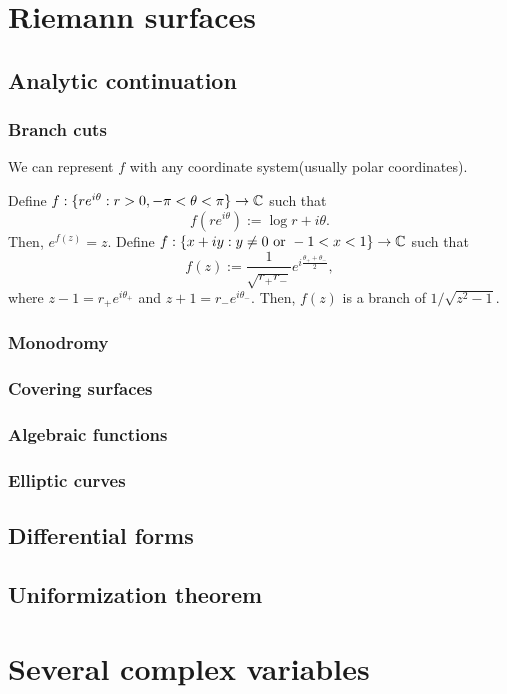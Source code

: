 \documentclass{../note}
\begin{document}
\part{Riemann surfaces}

\chapter{Analytic continuation}
\section{Branch cuts}
We can represent $f$ with any coordinate system(usually polar coordinates).

Define $f:\{re^{i\theta}:r>0,-\pi<\theta<\pi\}\to\mathbb{C}$ such that
\[f(re^{i\theta}):=\log r+i\theta.\]
Then, $e^{f(z)}=z$.
Define $f:\{x+iy:y\ne0\text{ or }-1<x<1\}\to\mathbb{C}$ such that
\[f(z):=\frac1{\sqrt{r_+r_-}}e^{i\frac{\theta_++\theta_-}2},\]
where $z-1=r_+e^{i\theta_+}$ and $z+1=r_-e^{i\theta_-}$.
Then, $f(z)$ is a branch of $1/\sqrt{z^2-1}$.
\section{Monodromy}
\section{Covering surfaces}
\section{Algebraic functions}
\section{Elliptic curves}

\chapter{Differential forms}

\chapter{Uniformization theorem}




\part{Several complex variables}
\end{document}
